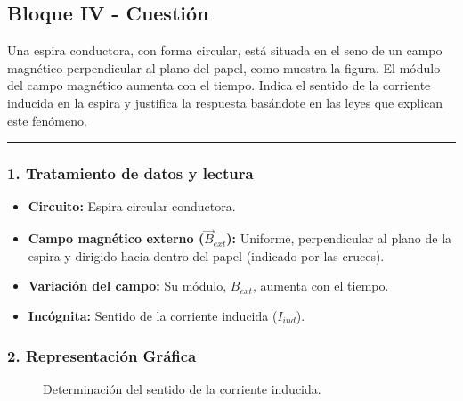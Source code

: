 \newpage

\subsection{Bloque IV - Cuestión}
\label{subsec:B4_2013_jul_ext}

\begin{cajaenunciado}
Una espira conductora, con forma circular, está situada en el seno de un campo magnético perpendicular al plano del papel, como muestra la figura. El módulo del campo magnético aumenta con el tiempo. Indica el sentido de la corriente inducida en la espira y justifica la respuesta basándote en las leyes que explican este fenómeno.
\end{cajaenunciado}
\hrule

\subsubsection*{1. Tratamiento de datos y lectura}
\begin{itemize}
    \item \textbf{Circuito:} Espira circular conductora.
    \item \textbf{Campo magnético externo ($\vec{B}_{ext}$):} Uniforme, perpendicular al plano de la espira y dirigido hacia dentro del papel (indicado por las cruces).
    \item \textbf{Variación del campo:} Su módulo, $B_{ext}$, aumenta con el tiempo.
    \item \textbf{Incógnita:} Sentido de la corriente inducida ($I_{ind}$).
\end{itemize}

\subsubsection*{2. Representación Gráfica}
\begin{figure}[H]
    \centering
    \caption{Determinación del sentido de la corriente inducida.}
\end{figure}

